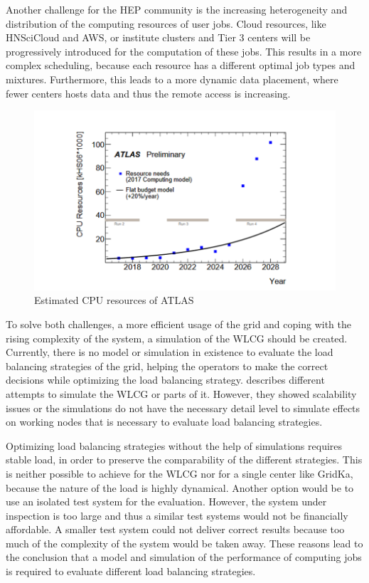 \documentclass[a4paper]{jpconf}
\begin{document}
Another challenge for the HEP community is the increasing heterogeneity and distribution of the computing resources of user jobs. Cloud resources, like HNSciCloud and AWS, or institute clusters and Tier 3 centers will be progressively introduced for the computation of these jobs. This results in a more complex scheduling, because each resource has a different optimal job types and mixtures. Furthermore, this leads to a more dynamic data placement, where fewer centers hosts data and thus the remote access is increasing.

\begin{figure}
	\centering
	\includegraphics[width=1.0\linewidth]{images/resources}
	\caption[]{Estimated CPU resources of ATLAS \cite{community}}
	\label{resources}
\end{figure}

To solve both challenges, a more efficient usage of the grid and coping with the rising complexity of the system, a simulation of the WLCG should be created.
Currently, there is no model or simulation in existence to evaluate the load balancing strategies of the grid, helping the operators to make the correct decisions while optimizing the load balancing strategy.
 describes different attempts to simulate the WLCG or parts of it. However, they showed scalability issues or the simulations do not have the necessary detail level to simulate effects on working nodes that is necessary to evaluate load balancing strategies.

Optimizing load balancing strategies without the help of simulations requires stable load, in order to preserve the comparability of the different strategies. This is neither possible to achieve for the WLCG nor for a single center like GridKa, because the nature of the load is highly dynamical. Another option would be to use an isolated test system for the evaluation. However, the system under inspection is too large and thus a similar test systems would not be financially affordable. A smaller test system could not deliver correct results because too much of the complexity of the system would be taken away.
These reasons lead to the conclusion that a model and simulation of the performance of computing jobs is required to evaluate different load balancing strategies.
\end{document}
